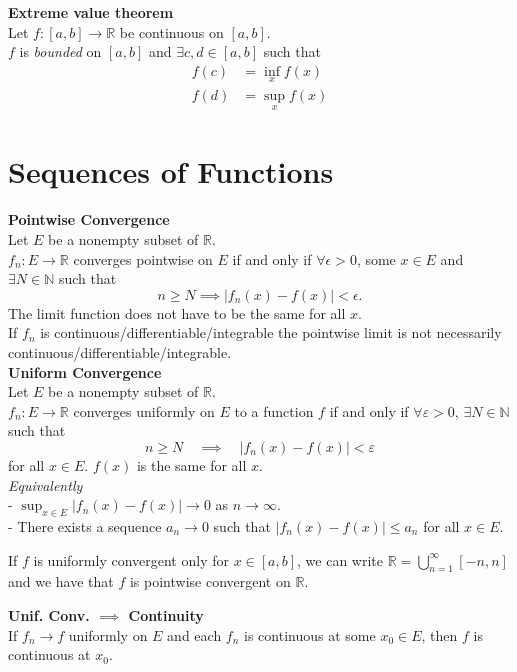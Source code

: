 \documentclass[a4paper, 10pt]{article}
\begin{document}
\begin{multicols*}{3}
\textbf{Extreme value theorem}\\ 
Let $f:[a, b] \rightarrow \mathbb{R}$ be continuous on $[a, b]$. \\
$f$ is \textit{bounded} on $[a,b]$ and $\exists c, d \in[a, b]$ such that
$$
\begin{aligned}
f(c)&=\inf_x f(x)\\
f(d)&=\sup_x f(x)
\end{aligned}
$$

\section*{Sequences of Functions}

\textbf{Pointwise Convergence}\\
Let $E$ be a nonempty subset of $\mathbb{R}$. \\
$f_n: E\rightarrow\mathbb{R}$ converges pointwise on $E$
if and only if $\forall\epsilon>0$, some $x\in E$ and $\exists N\in\mathbb{N}$ such that$$n\geq N \implies |f_n(x)-f(x)|<\epsilon.$$
The limit function does not have to be the same for all $x$.\\
If $f_n$ is continuous/differentiable/integrable the pointwise limit is not necessarily continuous/differentiable/integrable.\\

\textbf{Uniform Convergence}\\
Let $E$ be a nonempty subset of $\mathbb{R}$. \\
$f_n: E \rightarrow \mathbb{R}$ converges uniformly on $E$ to a function $f$ 
if and only if $\forall\varepsilon>0$, $\exists N \in \mathbb{N}$ such that
$$
n \geq N \quad \implies \quad\left|f_n(x)-f(x)\right|<\varepsilon
$$
for all $x \in E$. $f(x)$ is the same for all $x$.\\
\textit{Equivalently}\\
- $\sup _{x \in E}\left|f_n(x)-f(x)\right| \rightarrow 0$ as $n \rightarrow \infty$.\\
- There exists a sequence $a_n \rightarrow 0$ such that $\left|f_n(x)-f(x)\right| \leq a_n$ for all $x \in E$.

If $f$ is uniformly convergent only for $x\in[a,b]$, we can write $\mathbb{R}=\bigcup_{n=1}^{\infty}[-n, n]$ and we have that $f$ is pointwise convergent on $\mathbb{R}$.  

\textbf{Unif. Conv. $\implies$ Continuity}\\
If $f_n\rightarrow f$ uniformly on $E$ and each $f_n$ is continuous at some $x_0 \in E$, then $f$ is continuous at $x_0$.


\end{multicols*}
\end{document}

